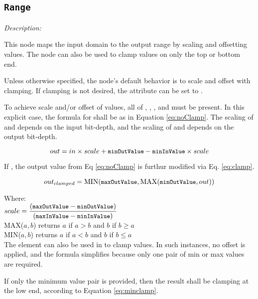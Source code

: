 \subsection{\texttt{Range}}

\emph{Description:} \par
This node maps the input domain to the output range by scaling and offsetting values. The  node can also be used to clamp values on only the top or bottom end.

Unless otherwise specified, the node's default behavior is to scale and offset with clamping. If clamping is not desired, the  attribute can be set to .

To achieve scale and/or offset of values, all of , , , and  must be present. In this explicit case, the formula for  shall be as in Equation \ref{eq:noClamp}. The scaling of  and  depends on the input bit-depth, and the scaling of  and  depends on the output bit-depth.

\begin{equation}\label{eq:noClamp}
	out = in \times scale + {\small \texttt{minOutValue}} - {\small \texttt{minInValue}} \times scale
\end{equation}

If , the output value from Eq \ref{eq:noClamp} is furthur modified via Eq. \ref{eq:clamp}.

\begin{equation}\label{eq:clamp}
	out_{clamped} = \mathrm{MIN}({\small \texttt{maxOutValue}}, \mathrm{MAX}( {\small \texttt{minOutValue}}, out))
\end{equation}

\tabto{0.25in} Where: \\[6pt]
\tabto{0.5in} $scale = \dfrac{({\small \texttt{maxOutValue}} - {\small \texttt{minOutValue}})}{({\small \texttt{maxInValue}} - {\small \texttt{minInValue}})}$ \\[12pt]
\tabto{0.5in} MAX(${a,b}$) returns $a$ if $a > b$ and $b$ if $b \geq a$ \\[6pt]
\tabto{0.5in} MIN(${a,b}$) returns $a$ if $a < b$ and $b$ if $b \leq a$ \\[10pt]

The  element can also be used in to clamp values. In such instances, no offset is applied, and the formula simplifies because only one pair of min or max values are required. 

If only the minimum value pair is provided, then the result shall be clamping at the low end, according to Equation \ref{eq:minclamp}.

